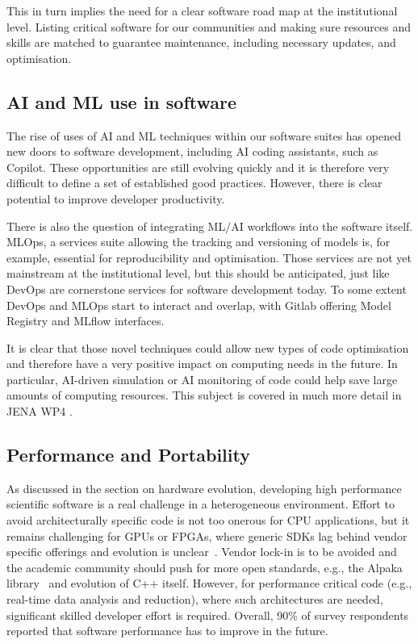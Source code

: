 This in turn implies the need for a clear software road map at the institutional level. Listing critical software for our communities and making sure resources and skills are matched to guarantee maintenance, including necessary updates, and optimisation.

\subsection{AI and ML use in software}

The rise of uses of AI and ML techniques within our software suites has opened new doors to software development, including AI coding assistants, such as Copilot. These opportunities are still evolving quickly and it is therefore very difficult to define a set of established good practices. However, there is clear potential to improve developer productivity.

There is also the question of integrating ML/AI workflows into the software itself. MLOps, a services suite allowing the tracking and versioning of models is, for example, essential for reproducibility and optimisation. Those services are not yet mainstream at the institutional level, but this should be anticipated, just like DevOps are cornerstone services for software development today. To some extent DevOps and MLOps start to interact and overlap, with Gitlab offering Model Registry and MLflow interfaces.

It is clear that those novel techniques could allow new types of code optimisation and therefore have a very positive impact on computing needs in the future. In particular, AI-driven simulation or AI monitoring of code could help save large amounts of computing resources. This subject is covered in much more detail in JENA WP4 \cite{JENA_WG_Reports}.

\subsection{Performance and Portability}

As discussed in the section on hardware evolution, developing high performance scientific software is a real challenge in a heterogeneous environment. Effort to avoid architecturally specific code is not too onerous for CPU applications, but it remains challenging for GPUs or FPGAs, where generic SDKs lag behind vendor specific offerings and evolution is unclear~\cite{atif2023evaluatingportableparallelizationstrategies}. Vendor lock-in is to be avoided and the academic community should push for more open standards, e.g., the Alpaka library~\cite{MathesP3MA2017} and evolution of C++ itself. However, for performance critical code (e.g., real-time data analysis and reduction), where such architectures are needed, significant skilled developer effort is required. Overall, 90\% of survey respondents reported that software performance has to improve in the future.

